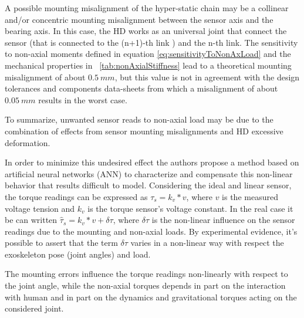 %
%
\par A possible mounting misalignment of the hyper-static chain may be a collinear and/or concentric mounting misalignment between the sensor axis and the bearing axis. In this case, the HD works as an universal joint that connect the sensor (that is connected to the (n+1)-th link ) and the n-th link. The sensitivity to non-axial moments defined in equation \eqref{eq:sensitivityToNonAxLoad} and  the mechanical properties  in \tablename \ \ref{tab:nonAxialStiffness} lead to a theoretical mounting misalignment of about $0.5 \ mm$, but this value is not in agreement with the design tolerances and components data-sheets from which a misalignment of about $0.05 \ mm$ results in the worst case.
%
\par To summarize, unwanted sensor reads to non-axial load may be due to the combination of effects from sensor mounting misalignments and HD excessive deformation. 
\par In order to minimize this undesired effect the authors propose a method based on artificial neural networks (ANN) to characterize and compensate this non-linear behavior that results difficult to model.
%
%
Considering the ideal and linear sensor, the torque readings can be expressed as $\tau_s = k_v * v$, where $v$ is the measured voltage tension and $k_v$ is the torque sensor's voltage constant. In the real case it be can written $\hat{\tau}_s = k_v * v + \delta\tau$, where $\delta\tau$ is the non-linear influence on the sensor readings due to the mounting and non-axial loads.
By experimental evidence, it's possible to assert that the term $\delta\tau$ varies in a non-linear way with respect the exoskeleton pose (joint angles) and load.
\par The mounting errors influence the torque readings non-linearly with respect to the joint angle, while the non-axial torques depends in part on the interaction with human and in part on the dynamics and gravitational torques acting on the considered joint.
